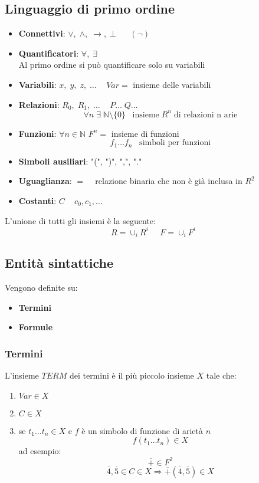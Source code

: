 \documentclass{article}
\theoremstyle{break}
\theoremstyle{break}
\theoremstyle{break}
\theoremstyle{break}
\begin{document}
\subsection{Linguaggio di primo ordine}
\begin{itemize}
  \item \textbf{Connettivi}: \( \vee,\; \wedge,\; \to,\; \bot\;\;\;\;\;\;(\neg) \) 
  \item \textbf{Quantificatori}: \( \forall,\; \exists \)\\
    Al primo ordine si può quantificare solo su variabili
  \item \textbf{Variabili}: \( x,\;y,\;z,\; \ldots \) \(\;\;\; Var = \) insieme delle variabili
  \item \textbf{Relazioni}: \( R_0,\; R_1,\; \ldots \) \( \;\;\; P \ldots \;Q \ldots \) 
    \[
    \forall n\; \exists\; \mathbb{N} \setminus \{0\} \;\;\; \text{insieme} \; R^n\; \text{di relazioni n arie}
    \] 
  \item \textbf{Funzioni}: \( \forall n \in \mathbb{N} \) \( F^n =\) insieme di funzioni 
    \[
    f_1 \ldots f_n \;\;\; \text{simboli per funzioni}
    \] 
  \item \textbf{Simboli ausiliari}: "(", ")", ",", "."
  \item \textbf{Uguaglianza}: \( =\;\;\; \) relazione binaria che non è già inclusa in \( R^2 \)  
  \item \textbf{Costanti}: \( C\;\;\; \) \( c_0, c_1, \ldots \)  
\end{itemize}
L'unione di tutti gli insiemi è la seguente:
\[
R = \cup_i R^i \;\;\;\;\; F = \cup_i F^i
\] 
\subsection{Entità sintattiche}
Vengono definite su:
\begin{itemize}
  \item \textbf{Termini}
  \item \textbf{Formule}
\end{itemize}

\subsubsection{Termini}
L'insieme \( TERM \) dei termini è il più piccolo insieme \( X \) tale che:
\begin{enumerate}
  \item \( Var \in X \)
  \item \( C \in X \)
  \item se \( t_1 \ldots t_n \in X \) e \( f \) è un simbolo di funzione di arietà \( n \) 
    \[
    f(t_1 \ldots t_n) \in X
    \] 
    ad esempio:
        \[
          \overline{+} \in F^2
        \] 
        \[
          \overline{4}, \overline{5} \in C \in X \Rightarrow \overline{+}(\overline{4}, \overline{5}) \in X
        \] 
\end{enumerate}
\end{document}

